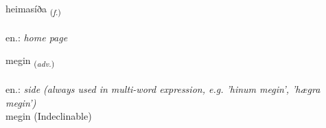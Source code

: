 \documentclass[frontgrid, backgrid]{flacards}\usepackage[]{graphicx}\usepackage[]{xcolor}
\begin{document}
\renewcommand{\flhead}{\vskip5pt \fboxsep=0pt {\small\bfseries\footnotesize Nafnorð | Noun}}
\renewcommand{\fcfoot}{\vskip5pt \fboxsep=0pt \hspace{2pt}{\small\bfseries\footnotesize 2K}}

\renewcommand{\blhead}{\vskip5pt {\small\bfseries\footnotesize Nafnorð | Noun }}
\renewcommand{\bcfoot}{\vskip5pt \hspace{2pt}{\small\bfseries\footnotesize 2K}}


{heimasíða \small{\textsubscript{(\textit{f.})}} \\[1ex] %
\textphonetic{[heiːmasiða]} \\
en.: \emph{home page} \\  [2ex]
\renewcommand*{\arraystretch}{0.8}
}


\renewcommand{\flhead}{\vskip5pt \fboxsep=0pt {\small\bfseries\footnotesize Atviksorð | Adverb}}
\renewcommand{\fcfoot}{\vskip5pt \fboxsep=0pt \hspace{2pt}{\small\bfseries\footnotesize 2K}}

\renewcommand{\blhead}{\vskip5pt {\small\bfseries\footnotesize Atviksorð | Adverb }}
\renewcommand{\bcfoot}{\vskip5pt \hspace{2pt}{\small\bfseries\footnotesize 2K}}


{megin \small{\textsubscript{(\textit{adv.})}} \\[1ex]
\textphonetic{[meijɪn]} \\
en.: \emph{side (always used in multi-word expression, e.g. 'hinum megin', 'hægra megin')} \\  [2ex]
megin (Indeclinable)}
\end{document}
